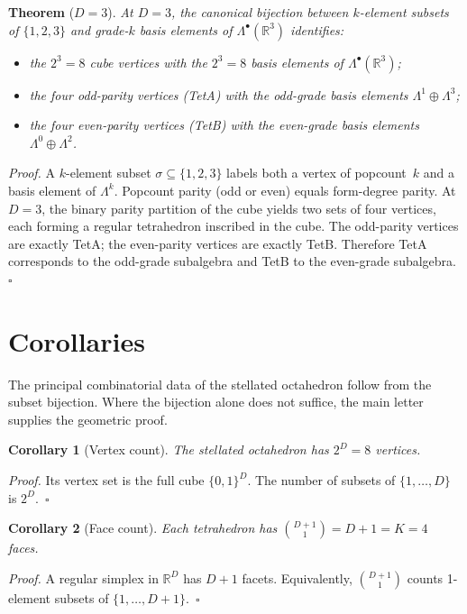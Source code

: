 \documentclass[twocolumn]{iopjournal}
\begin{document}
\noindent\textbf{Theorem} ($D = 3$). \textit{At $D = 3$, the canonical bijection between $k$-element subsets of $\{1,2,3\}$ and grade-$k$ basis elements of $\Lambda^\bullet(\mathbb{R}^3)$ identifies:}
\begin{itemize}
\item \textit{the $2^3 = 8$ cube vertices with the $2^3 = 8$ basis elements of $\Lambda^\bullet(\mathbb{R}^3)$;}
\item \textit{the four odd-parity vertices (TetA) with the odd-grade basis elements $\Lambda^1 \oplus \Lambda^3$;}
\item \textit{the four even-parity vertices (TetB) with the even-grade basis elements $\Lambda^0 \oplus \Lambda^2$.}
\end{itemize}

\noindent\textit{Proof.} A $k$-element subset $\sigma \subseteq \{1,2,3\}$ labels both a vertex of popcount~$k$ and a basis element of $\Lambda^k$. Popcount parity (odd or even) equals form-degree parity. At $D = 3$, the binary parity partition of the cube yields two sets of four vertices, each forming a regular tetrahedron inscribed in the cube. The odd-parity vertices are exactly TetA; the even-parity vertices are exactly TetB. Therefore TetA corresponds to the odd-grade subalgebra and TetB to the even-grade subalgebra.~$\square$


\section*{Corollaries}

The principal combinatorial data of the stellated octahedron follow from the subset bijection. Where the bijection alone does not suffice, the main letter supplies the geometric proof.

\vspace{6pt}
\noindent\textbf{Corollary 1} (Vertex count). \textit{The stellated octahedron has $2^D = 8$ vertices.}

\noindent\textit{Proof.} Its vertex set is the full cube $\{0,1\}^D$. The number of subsets of $\{1,\ldots,D\}$ is $2^D$.~$\square$

\vspace{6pt}
\noindent\textbf{Corollary 2} (Face count). \textit{Each tetrahedron has $\binom{D+1}{1} = D + 1 = K = 4$ faces.}

\noindent\textit{Proof.} A regular simplex in $\mathbb{R}^D$ has $D + 1$ facets. Equivalently, $\binom{D+1}{1}$ counts 1-element subsets of $\{1,\ldots,D+1\}$.~$\square$
\end{document}
